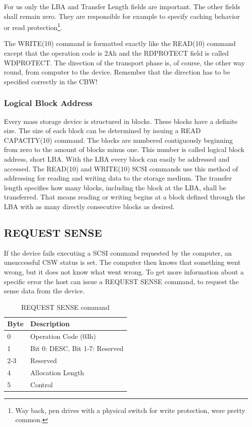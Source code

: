 For us only the LBA and Transfer Length fields are important. The other fields shall remain zero. They are responsible for example to specify caching behavior or read protection\footnote{Way back, pen drives with a physical switch for write protection, were pretty common.}.

The WRITE(10) command is formatted exactly like the READ(10) command except that the operation code is 2Ah and the RDPROTECT field is called WDPROTECT. The direction of the transport phase is, of course, the other way round, from computer to the device. Remember that the direction has to be specified correctly in the CBW!

\subsubsection{Logical Block Address}

Every mass storage device is structured in blocks. These blocks have a definite size. The size of each block can be determined by issuing a READ CAPACITY(10) command. The blocks are numbered contiguously beginning from zero to the amount of blocks minus one. This number is called logical block address, short LBA. With the LBA every block can easily be addressed and accessed. The READ(10) and WRITE(10) SCSI commands use this method of addressing for reading and writing data to the storage medium. The transfer length specifies how many blocks, including the block at the LBA, shall be transferred. That means reading or writing begins at a block defined through the LBA with as many directly consecutive blocks as desired.

\subsection{REQUEST SENSE}

If the device fails executing a SCSI command requested by the computer, an unsuccessful CSW status is set. The computer then knows that something went wrong, but it does not know what went wrong. To get more information about a specific error the host can issue a REQUEST SENSE command, to request the sense data from the device.

\begin{table}[ht]
\caption{REQUEST SENSE command \cite{scsi_seagate}}
\centering
\begin{tabular}{|l|l|}
\hline\hline
\textbf{Byte} & \textbf{Description}\\ \hline
0 & Operation Code (03h)\\ \hline
1 & Bit 0: DESC, Bit 1-7: Reserved \\ \hline
2-3 & Reserved \\ \hline
4 & Allocation Length \\ \hline
5 & Control \\ \hline
\end{tabular}
\label{table:request_sense}
\end{table}

